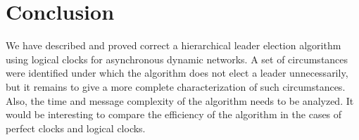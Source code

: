 \documentclass{article}
\begin{document}
\section{Conclusion}
We have described and proved correct a hierarchical leader election algorithm using logical clocks for asynchronous dynamic networks. A set of circumstances were identified under which the algorithm does not elect a leader unnecessarily, but it remains to give a more complete characterization of such circumstances. Also, the time and message complexity of the algorithm needs to be analyzed. It would be interesting to compare the efficiency of the algorithm in the cases of perfect clocks and logical clocks.

\newpage
  
\end{document}
